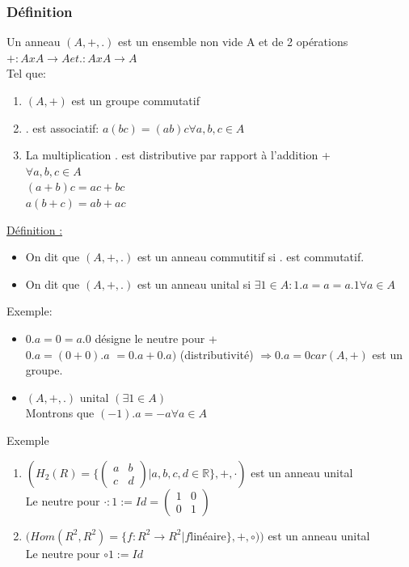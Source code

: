 \documentclass[11pt]{article}
\begin{document}
			\subsubsection{Définition}
				Un anneau $(A, +, .)$ est un ensemble non vide A et de 2 opérations $+: A x A \rightarrow A et .: A x A \rightarrow A$\\
				Tel que:
				\begin{enumerate}
					 \item $(A, +)$ est un groupe commutatif
					 \item . est associatif: $a(bc) = (ab) c \forall a, b, c \in A$
					 \item La multiplication . est distributive par rapport à l'addition +\\
						$\forall a, b, c \in A$\\
						$(a+b)c = ac + bc$\\
						$a(b+c) = ab + ac$
				\end{enumerate}
	
			\underline{Définition :}
				\begin{itemize}
					 \item On dit que $(A, +, .)$ est un anneau commutitif si . est commutatif.
					 \item On dit que $(A, +, .)$ est un anneau unital si $\exists 1 \in A : 1.a = a = a.1 \forall a \in A$
				\end{itemize}
				
			Exemple:
				\begin{itemize}
					 \item $0.a = 0 = a.0$ désigne le neutre pour + \\
					$0.a = (0+0).a$
					$= 0.a + 0.a)$ (distributivité)
					$\Rightarrow 0.a = 0 car (A, +)$ est un groupe.
					 \item $(A, +, .)$ unital $(\exists 1 \in A)$\\
					Montrons que $(-1).a = -a   \forall a \in A$
				\end{itemize}
				Exemple
				\begin{enumerate}
					\item $(H_2 (R) = \{ 
					\begin{pmatrix}
  						a & b \\
						c & d 
					\end{pmatrix} | a, b, c, d \in \mathbb R \}, +, \cdot )$ est un anneau unital\\
				 	Le neutre pour $\cdot: 1 := Id = \begin{pmatrix}
  					1 & 0 \\
					0 & 1 
				\end{pmatrix}$
					 \item $(Hom(R^2, R^2) = \{ f: R^2 \rightarrow R^2 | f $linéaire$ \}, +, \circ))$ est un anneau unital\\
					Le neutre pour $\circ 1 := Id$
					\end{enumerate}
	
\end{document}
